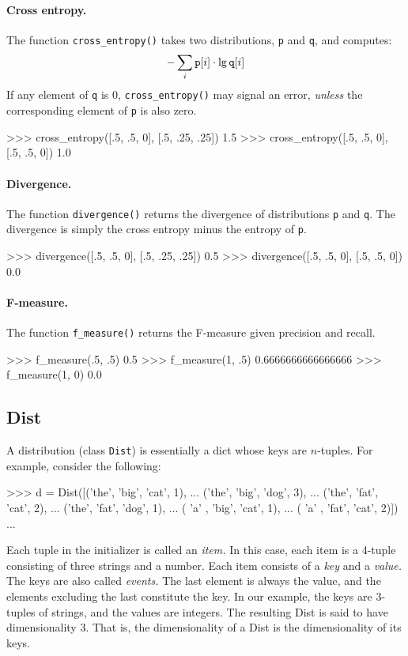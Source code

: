 \paragraph{Cross entropy.}  The function \verb|cross_entropy()|
takes two distributions, {\tt p} and {\tt q}, and computes:
\[ -\sum_i \mbox{\tt p}[i] \cdot \lg \mbox{\tt q}[i] \]
If any element of {\tt q} is 0, \verb|cross_entropy()|
may signal an error, {\em unless\/}
the corresponding element of {\tt p} is also zero.
\begin{python}
>>> cross_entropy([.5, .5, 0], [.5, .25, .25])
1.5
>>> cross_entropy([.5, .5, 0], [.5, .5, 0])
1.0
\end{python}

\paragraph{Divergence.}  The function \verb|divergence()| returns the
divergence of distributions {\tt p} and {\tt q}.  The divergence is
simply the cross entropy minus the entropy of {\tt p}.
\begin{python}
>>> divergence([.5, .5, 0], [.5, .25, .25])
0.5
>>> divergence([.5, .5, 0], [.5, .5, 0])
0.0
\end{python}

\paragraph{F-measure.}  The function \verb|f_measure()| returns the
F-measure given precision and recall.
\begin{python}
>>> f_measure(.5, .5)
0.5
>>> f_measure(1, .5)
0.6666666666666666
>>> f_measure(1, 0)
0.0
\end{python}


\subsection{Dist}

A distribution (class {\tt Dist}) is essentially a dict whose keys are $n$-tuples.
For example, consider the following:
\begin{python}
>>> d = Dist([('the', 'big', 'cat', 1),
...           ('the', 'big', 'dog', 3),
...           ('the', 'fat', 'cat', 2),
...           ('the', 'fat', 'dog', 1),
...           ( 'a' , 'big', 'cat', 1),
...           ( 'a' , 'fat', 'cat', 2)])
...
\end{python}
Each tuple in the initializer is called an {\it item.\/}  In this
case, each item is a 4-tuple consisting of three strings and a number.
Each item consists of a {\it key\/} and a {\it value.\/}
The keys are also called {\it events.\/}
The last element is always the value, and the elements excluding the
last constitute the key.  In our example, the keys are 3-tuples of
strings, and the values are integers.  The resulting Dist is said to
have dimensionality 3.  That is, the dimensionality of a Dist is the
dimensionality of its keys.

